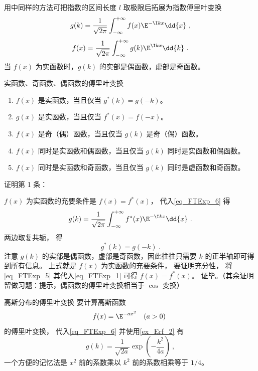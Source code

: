 

用中同样的方法可把指数的区间长度 $l$ 取极限后拓展为指数傅里叶变换
\begin{equation}\label{eq_FTExp_6}
g(k) = \frac{1}{\sqrt{2\pi }} \int_{-\infty }^{+\infty } f(x)\E^{-\I kx} \dd{x}~,
\end{equation}
\begin{equation}\label{eq_FTExp_1}
f(x) = \frac{1}{\sqrt{2\pi }} \int_{-\infty }^{+\infty } g(k)\E^{\I kx} \dd{k}~.
\end{equation}
当 $f(x)$ 为实函数时，$g(k)$ 的实部是偶函数，虚部是奇函数。

\begin{theorem}{实函数、奇函数、偶函数的傅里叶变换}\label{the_FTExp_1}
\begin{enumerate}
\item $f(x)$ 是实函数，当且仅当 $g^*(k) = g(-k)$。
\item $g(x)$ 是实函数，当且仅当 $f^*(x) = f(-x)$。
\item $f(x)$ 是奇（偶）函数，当且仅当 $g(k)$ 是奇（偶）函数。
\item $f(x)$ 同时是实函数和偶函数，当且仅当 $g(k)$ 同时是实函数和偶函数。
\item $f(x)$ 同时是实函数和奇函数，当且仅当 $g(k)$ 同时是虚函数和奇函数。
\end{enumerate}
\end{theorem}
证明第 1 条：

$f(x)$ 为实函数的充要条件是 $f(x) = f^*(x)$， 代入\autoref{eq_FTExp_6} 得
\begin{equation}
g(k) = \frac{1}{\sqrt{2\pi }} \int_{-\infty }^{+\infty } f^*(x)\E^{-\I kx} \dd{x}~.
\end{equation}
两边取复共轭， 得
\begin{equation}\label{eq_FTExp_5}
g^*(k) = g(-k)~.
\end{equation}
注意 $g(k)$ 的实部是偶函数，虚部是奇函数，因此往往只需要 $k$ 的正半轴即可得到所有信息。 上式就是 $f(x)$ 为实函数的充要条件， 要证明充分性， 将\autoref{eq_FTExp_5} 其代入\autoref{eq_FTExp_1} 可得 $f(x) = f^*(x)$。 证毕。（其余证明留做习题：提示，偶函数的傅里叶变换相当于 $\cos$ 变换）

\begin{example}{高斯分布的傅里叶变换}\label{ex_FTExp_1}
要计算高斯函数
\begin{equation}
f(x) = \E^{-ax^2} \quad (a > 0)~
\end{equation}
的傅里叶变换， 代入\autoref{eq_FTExp_6} 并使用\autoref{ex_Erf_2} 有
\begin{equation}
g(k) = \frac{1}{\sqrt{2a}} \exp(-\frac{k^2}{4a})~,
\end{equation}
一个方便的记忆法是 $x^2$ 前的系数乘以 $k^2$ 前的系数相乘等于 $1/4$。
\end{example}

